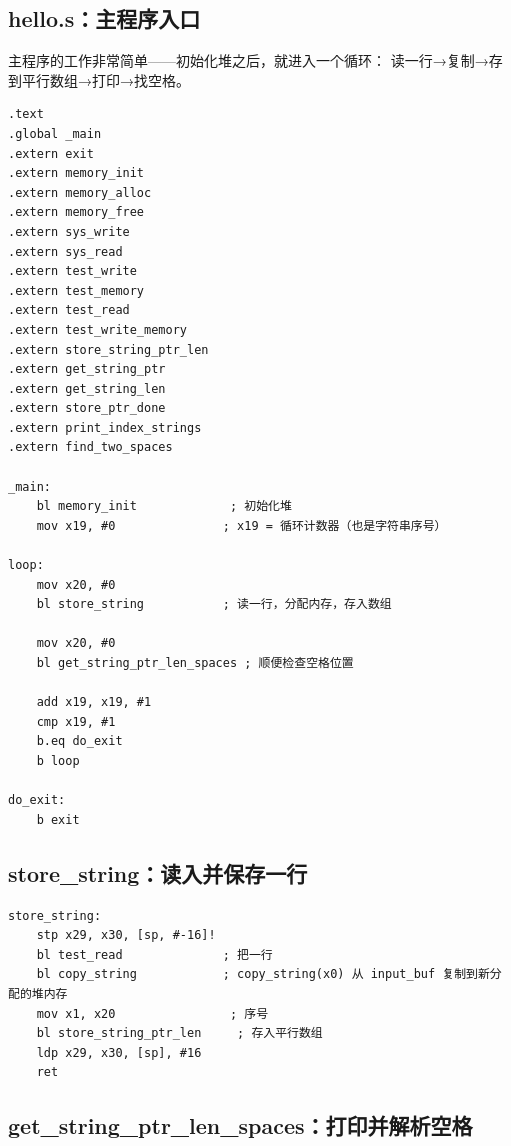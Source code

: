 \subsection{hello.s：主程序入口}

主程序的工作非常简单——初始化堆之后，就进入一个循环：
读一行→复制→存到平行数组→打印→找空格。

\begin{lstlisting}[style=asm,caption=hello.s — 主程序]
.text
.global _main
.extern exit
.extern memory_init
.extern memory_alloc
.extern memory_free
.extern sys_write
.extern sys_read
.extern test_write
.extern test_memory
.extern test_read
.extern test_write_memory
.extern store_string_ptr_len
.extern get_string_ptr
.extern get_string_len
.extern store_ptr_done
.extern print_index_strings
.extern find_two_spaces

_main:
    bl memory_init             ; 初始化堆
    mov x19, #0               ; x19 = 循环计数器（也是字符串序号）

loop:
    mov x20, #0
    bl store_string           ; 读一行，分配内存，存入数组

    mov x20, #0
    bl get_string_ptr_len_spaces ; 顺便检查空格位置

    add x19, x19, #1
    cmp x19, #1
    b.eq do_exit
    b loop

do_exit:
    b exit
\end{lstlisting}

\subsection{store\_string：读入并保存一行}

\begin{lstlisting}[style=asm,caption=hello.s — store\_string]
store_string:
    stp x29, x30, [sp, #-16]!
    bl test_read              ; 把一行
    bl copy_string            ; copy_string(x0) 从 input_buf 复制到新分配的堆内存
    mov x1, x20                ; 序号
    bl store_string_ptr_len     ; 存入平行数组
    ldp x29, x30, [sp], #16
    ret
\end{lstlisting}

\subsection{get\_string\_ptr\_len\_spaces：打印并解析空格}

